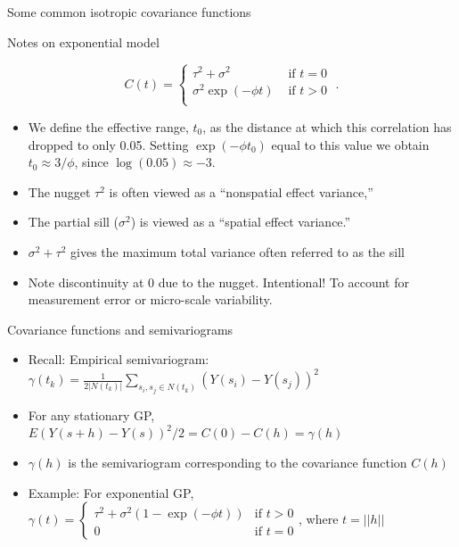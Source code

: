 \documentclass[xcolor=pdftex,dvipsnames,table,numbers,hyperref={pdfpagelabels=false},compress]{beamer}
\newcommand{\sis}{\sigma^2}
\newcommand{\blue}[1]{{\color{RoyalBlue!90} #1}}
\newcommand{\red}[1]{{\color{Red} #1}}
\newcommand{\green}[1]{{\color{Green} #1}}
\newcommand{\sigs}{\sigma^2}
\newcommand{\taus}{\tau^2}
\begin{document}
\begin{frame}{Some common isotropic covariance functions}
\begin{table}[t]
\begin{center}
		\end{center}
	\end{table}
\end{frame}

\begin{frame}{Notes on exponential model}
	
	$$
	C(t) = \left \{ \begin{array}{cl}
	\tau^2 + \sis &  \mbox{  if }t=0\\
	\sis \exp(-\phi t) &  \mbox{  if }t>0\\
	\end{array}\right . \; .
	$$%
	
	\begin{itemize}
		
		\item We define the \alert{effective range},  
		$t_0$, as the distance at which this correlation has dropped to
		only 0.05. Setting $\exp(-\phi t_0)$ equal to this value we obtain
		$t_0 \approx 3/\phi$, since $\log(0.05) \approx -3$. %
		
		\item The \alert{nugget} $\tau^2$ is often viewed as a \blue {``nonspatial effect variance,''}
		
		\item The  \alert{partial sill} ($\sigs$) is viewed as a \blue {``spatial effect variance.''} %
		
		\item $\sigs + \taus$ gives the maximum total variance often referred to as the \alert{sill}
		
		\item Note \blue{discontinuity} at $0$ due to the nugget.  \red{Intentional!} To account for measurement error or micro-scale variability.
	\end{itemize}
\end{frame}


\begin{frame}{Covariance functions and semivariograms}
	\begin{itemize}
		\item \green{Recall:} Empirical semivariogram: $\gamma(t_k) = \frac{1}{2|N(t_k)|}\sum_{s_i,s_j \in
		N(t_k)}(Y(s_i)-Y(s_j))^2$ 
	\item For any stationary GP, $E(Y(s+h)-Y(s))^2/2 = C(0)-C(h) = \gamma(h)$
	\item $\gamma(h)$ is the \alert{semivariogram} corresponding to the covariance function $C(h)$
	\item \green{Example:} For exponential GP, $\gamma(t) = 
	\left \{ \begin{array} {cl}%
	\tau^{2}+\sigma^{2}(1-\exp(-\phi t)) & \mbox{if } t>0\\
	0 & \mbox{if } t=0
	\end{array} \right .$, where $t=||h||$
	\end{itemize}
\end{frame}
\end{document}
